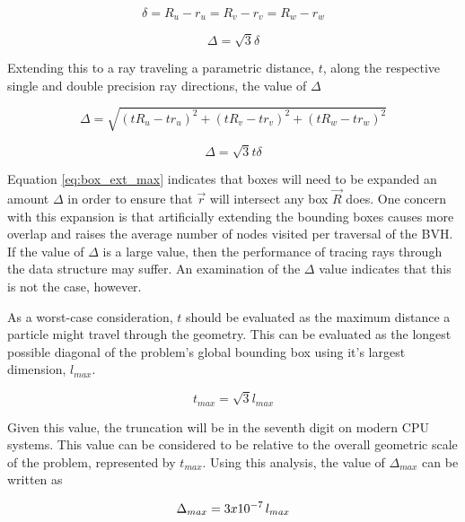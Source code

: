 \begin{equation}
  \delta = R_{u} - r_{u} = R_{v} - r_{v} = R_{w} -  r_{w}
\end{equation}

\begin{equation}
  \Delta = \sqrt{3} \delta
\end{equation}

Extending this to a ray traveling a parametric distance, $t$, along the
respective single and double precision ray directions, the value of $\Delta$

\begin{equation}
  \Delta = \sqrt{ (tR_{u} - tr_{u})^{2} + (tR_{v} - tr_{v})^{2} + (tR_{w} -
    tr_{w})^{2} }
\end{equation}

\begin{equation}
  \Delta = \sqrt{3} t \delta
  \label{eq:box_ext_max}
\end{equation}

Equation \eqref{eq:box_ext_max} indicates that boxes will need to be expanded an amount $\Delta$
in order to ensure that $\vec{r}$ will intersect any box $\vec{R}$ does. One
concern with this expansion is that artificially extending the bounding boxes
causes more overlap and raises the average number of nodes visited per traversal
of the BVH. If the value of $\Delta$ is a large value, then the performance of
tracing rays through the data structure may suffer. An examination of the
$\Delta$ value indicates that this is not the case, however.

As a worst-case consideration, $t$ should be evaluated as the maximum distance a
particle might travel through the geometry. This can be evaluated as the longest
possible diagonal of the problem's global bounding box using it's largest
dimension, $l_{max}$.

\begin{equation}
  t_{max} = \sqrt{3} l_{max}
\end{equation}

Given this value, the truncation will be in the seventh digit on modern
CPU systems. This value can be considered to be relative to the overall
geometric scale of the problem, represented by $t_{max}$. Using this analysis,
the value of $\Delta_{max}$ can be written as 

\begin{equation}
  \centering
  \Delta_{max} = 3 x 10^{-7} \, l_{max}
  \label{eq:box_extension_limit}
\end{equation}

